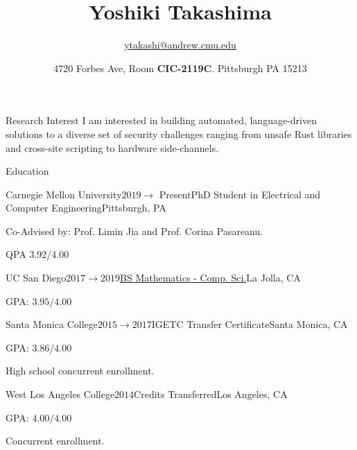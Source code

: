 \documentclass{resume} %
\title{Yoshiki Takashima}
\author{\href{ytakashi@andrew.cmu.edu}{ytakashi@andrew.cmu.edu}}
\date{4720 Forbes Ave, Room \textbf{CIC-2119C}. Pittsburgh PA 15213}
\begin{document}
\maketitle

\begin{rSection}{Research Interest}
I am interested in building automated, language-driven solutions to a diverse set of security challenges ranging from unsafe Rust libraries and cross-site scripting to hardware side-channels.
\end{rSection}


\begin{rSection}{Education}
\begin{rSubsection}{Carnegie Mellon University}{$2019 \rightarrow$ Present}{PhD Student in Electrical and Computer Engineering}{Pittsburgh, PA}
    \item Co-Advised by: Prof. Limin Jia and Prof. Corina Pasareanu.
    \item QPA 3.92/4.00
\end{rSubsection}

\begin{rSubsection}{UC San Diego}{$2017 \rightarrow 2019$}{\href{https://www.math.ucsd.edu/~handbook/undergraduate/ma30-math-computer-science-b-s/}{BS Mathematics - Comp. Sci.}}{La Jolla, CA}
    \item GPA: $3.95/4.00$
\end{rSubsection}

\begin{rSubsection}{Santa Monica College}{$2015 \rightarrow 2017$}{IGETC Transfer Certificate}{Santa Monica, CA}
    \item GPA: $3.86/4.00$
    \item High school concurrent enrollment.
\end{rSubsection}

\begin{rSubsection}{West Los Angeles College}{$2014$}{Credits Transferred}{Los Angeles, CA}
    \item GPA: $4.00/4.00$
    \item Concurrent enrollment.
\end{rSubsection}
\end{rSection}
\end{document}

